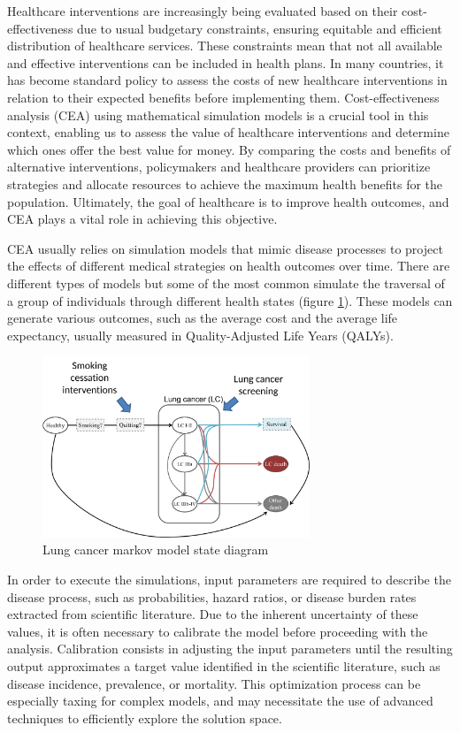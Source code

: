 \documentclass[sn-mathphys,Numbered]{sn-jnl}%
\begin{document}
Healthcare interventions are increasingly being evaluated based on their cost-effectiveness due to usual budgetary constraints, ensuring equitable and efficient distribution of healthcare services. These constraints mean that not all available and effective interventions can be included in health plans. In many countries, it has become standard policy to assess the costs of new healthcare interventions in relation to their expected benefits before implementing them. Cost-effectiveness analysis (CEA) using mathematical simulation models is a crucial tool in this context, enabling us to assess the value of healthcare interventions and determine which ones offer the best value for money\cite{drummond}. By comparing the costs and benefits of alternative interventions, policymakers and healthcare providers can prioritize strategies and allocate resources to achieve the maximum health benefits for the population. Ultimately, the goal of healthcare is to improve health outcomes, and CEA plays a vital role in achieving this objective\cite{levin}.

CEA usually relies on simulation models that mimic disease processes to project the effects of different medical strategies on health outcomes over time\cite{applied_he}. There are different types of models but some of the most common simulate the traversal of a group of individuals through different health states (figure \ref{fig:lung_model}). These models can generate various outcomes, such as the average cost and the average life expectancy, usually measured in Quality-Adjusted Life Years (QALYs)\cite{qalys}.

\begin{figure}[h!]
	\centering	
	\includegraphics[width=80mm]{figs/lungmodel.pdf}		
	\caption{Lung cancer markov model state diagram}	
	\label{fig:lung_model}	
\end{figure}

In order to execute the simulations, input parameters are required to describe the disease process, such as probabilities, hazard ratios, or disease burden rates extracted from scientific literature. Due to the inherent uncertainty of these values, it is often necessary to calibrate the model before proceeding with the analysis. Calibration consists in adjusting the input parameters until the resulting output approximates a target value identified in the scientific literature, such as disease incidence, prevalence, or mortality. This optimization process can be especially taxing for complex models, and may necessitate the use of advanced techniques to efficiently explore the solution space.
\end{document}
